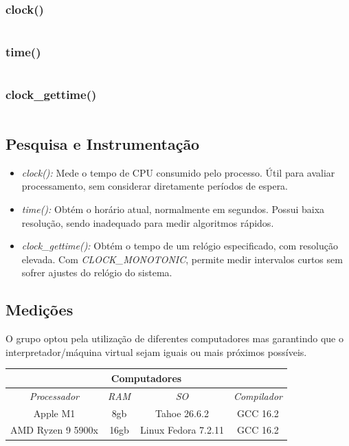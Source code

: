 \documentclass[12pt,a4paper,titlepage]{article}
\begin{document}
\subsubsection{clock()}
\inputminted[fontsize=\small,linenos,frame=single,breaklines=true]{c}{../C/clock.c}

\subsubsection{time()}
\inputminted[fontsize=\small,linenos,frame=single,breaklines=true]{c}{../C/time.c}

\subsubsection{clock\_gettime()}
\inputminted[fontsize=\small,linenos,frame=single,breaklines=true]{c}{../C/gettime.c}

\subsection{Pesquisa e Instrumentação}
\begin{itemize}
    \item \textit{clock():} Mede o tempo de CPU consumido pelo processo. Útil para avaliar processamento, sem considerar diretamente períodos de espera.
    \item \textit{time():} Obtém o horário atual, normalmente em segundos. Possui baixa resolução, sendo inadequado para medir algoritmos rápidos.
    \item \textit{clock\_gettime():} Obtém o tempo de um relógio especificado, com resolução elevada. 
        Com \textit{CLOCK\_MONOTONIC}, permite medir intervalos curtos sem sofrer ajustes do relógio do sistema.
\end{itemize}

\subsection{Medições}
O grupo optou pela utilização de diferentes computadores mas garantindo que o 
interpretador/máquina virtual sejam iguais ou mais próximos possíveis.

\begin{center}
    \begin{tabular}{ || c | c | c | c || }
        \hline
        \multicolumn{4}{||c||}{\textbf{Computadores}}\\
        \hline \hline
        \textit{Processador} & \textit{RAM} & \textit{SO} & \textit{Compilador} \\ [0.5ex]
        \hline
        Apple M1 & 8gb & Tahoe 26.6.2 & GCC 16.2 \\
        \hline
        AMD Ryzen 9 5900x & 16gb & Linux Fedora 7.2.11 & GCC 16.2 \\
        \hline
    \end{tabular}
\end{center}
\end{document}
